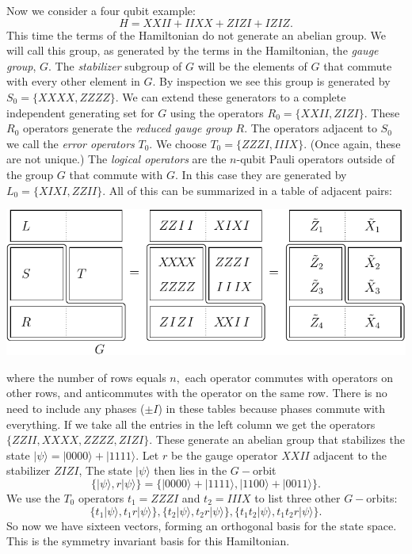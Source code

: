 \documentclass[11pt,oneside]{article}
\def\Ham{H}
\def\Stab{S}
\newcommand{\ket}[1]{|{#1}\rangle}
\newcommand\doexample[1]{\vskip 5pt \noindent {\bf \underline{Example #1.}\ }}
\newcounter{numitem}
\newcommand{\numitem}[1]{\refstepcounter{numitem}\thenumitem\label{#1}}
\begin{document}
\doexample{\numitem{Ex3}}
Now we consider a four qubit example:
$$
    \Ham = XXII + IIXX + ZIZI + IZIZ.
$$
This time the terms of the Hamiltonian do not generate 
an abelian group.
We will call this group, as generated by the terms in the Hamiltonian,
the \emph{gauge group}, $G$.
The \emph{stabilizer} subgroup of $G$ will be the elements of $G$
that commute with every other element in $G.$
By inspection we see this group is generated by $\Stab_0=\{XXXX, ZZZZ\}.$
We can extend these generators to a complete independent generating
set for $G$ using the operators  $R_0=\{XXII, ZIZI\}.$
These $R_0$ operators generate the \emph{reduced gauge group} $R.$
The operators adjacent to $\Stab_0$ we
call the \emph{error operators} $T_0$. 
We choose $T_0 = \{ZZZI, IIIX\}.$
(Once again, these are not unique.)
The \emph{logical operators} are the $n$-qubit 
Pauli operators outside of the group
$G$ that commute with $G.$
In this case they are generated by $L_0 = \{XIXI, ZZII\}.$
All of this can be summarized in a table of adjacent pairs:
\begin{center}
\includegraphics[]{pic-gauge4.pdf}
\end{center}
where the number of rows equals $n,$ 
each operator commutes with operators on other rows,
and anticommutes with the operator on the same row. 
There is no need to include any phases ($\pm I$) in these tables
because phases commute with everything.
If we take all the entries in the left column
we get the operators 
$\{ ZZII, XXXX, ZZZZ, ZIZI \}.$ 
These generate an abelian group 
that stabilizes the
state $\ket{\psi} = \ket{0000}+\ket{1111}.$
Let $r$ be the gauge operator $XXII$ adjacent to the 
stabilizer $ZIZI$,
The state $\ket{\psi}$ then lies in the $G-$orbit 
$$
\{\ket{\psi}, r\ket{\psi}\} = \{\ket{0000}+\ket{1111}, \ket{1100}+\ket{0011}\}.
$$
We use the $T_0$ operators $t_1=ZZZI$ and $t_2=IIIX$
to list three other $G-$orbits:
$$
\{t_1 \ket{\psi}, t_1 r\ket{\psi}\}, 
\{t_2 \ket{\psi}, t_2 r\ket{\psi}\}, 
\{t_1 t_2 \ket{\psi}, t_1 t_2 r\ket{\psi}\}.
$$
So now we have sixteen vectors, forming an orthogonal basis for the state space.
This is the symmetry invariant basis for this Hamiltonian.
\end{document}
